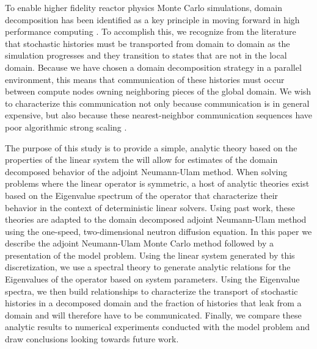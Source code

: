\documentclass{mc2013}
\begin{document}
To enable higher fidelity reactor physics Monte Carlo simulations,
domain decomposition has been identified as a key principle in moving
forward in high performance computing
\cite{brunner_comparison_2006,siegel_analysis_2012}. To accomplish
this, we recognize from the literature that stochastic histories must
be transported from domain to domain as the simulation progresses and
they transition to states that are not in the local domain. Because we
have chosen a domain decomposition strategy in a parallel environment,
this means that communication of these histories must occur between
compute nodes owning neighboring pieces of the global domain. We wish
to characterize this communication not only because communication is
in general expensive, but also because these nearest-neighbor
communication sequences have poor algorithmic strong scaling
\cite{gropp_high-performance_2001}.

The purpose of this study is to provide a simple, analytic theory
based on the properties of the linear system the will allow for
estimates of the domain decomposed behavior of the adjoint
Neumann-Ulam method. When solving problems where the linear operator
is symmetric, a host of analytic theories exist based on the
Eigenvalue spectrum of the operator that characterize their behavior
in the context of deterministic linear solvers. Using past work, these
theories are adapted to the domain decomposed adjoint Neumann-Ulam
method using the one-speed, two-dimensional neutron diffusion
equation. In this paper we describe the adjoint Neumann-Ulam Monte
Carlo method followed by a presentation of the model problem. Using
the linear system generated by this discretization, we use a spectral
theory to generate analytic relations for the Eigenvalues of the
operator based on system parameters. Using the Eigenvalue spectra, we
then build relationships to characterize the transport of stochastic
histories in a decomposed domain and the fraction of histories that
leak from a domain and will therefore have to be
communicated. Finally, we compare these analytic results to numerical
experiments conducted with the model problem and draw conclusions
looking towards future work.

\label{sec:adjoint_nu}
\end{document}
